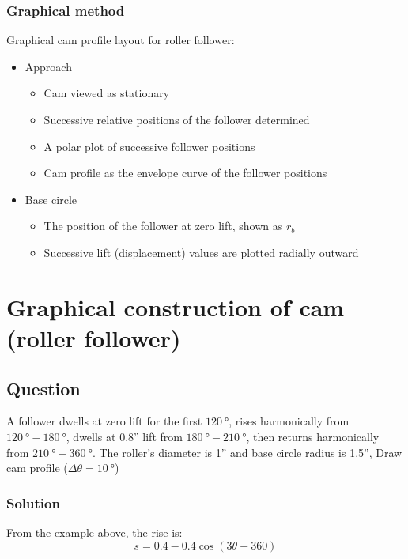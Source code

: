 \documentclass[11pt]{article}
\begin{document}
\subsubsection{Graphical method}
\label{sec:org0fa9382}
Graphical cam profile layout for roller follower:
\begin{itemize}
\item Approach
\begin{itemize}
\item Cam viewed as stationary
\item Successive relative positions of the follower determined
\item A polar plot of successive follower positions
\item Cam profile as the envelope curve of the follower positions
\end{itemize}

\item Base circle
\begin{itemize}
\item The position of the follower at zero lift, shown as \(r_b\)
\item Successive lift (displacement) values are plotted radially outward
\end{itemize}
\end{itemize}

 \newpage
\section{Graphical construction of cam (roller follower)}
\label{sec:org0833060}

\subsection{Question}
\label{sec:orge43da2b}
A follower dwells at zero lift for the first \(\qty{120}{\degree}\), rises harmonically from \(\qty{120}{\degree} - \qty{180}{\degree}\), dwells at 0.8'' lift from \(\qty{180}{\degree} - \qty{210}{\degree}\), then returns harmonically from \(\qty{210}{\degree} - \qty{360}{\degree}\). The roller's diameter is 1'' and base circle radius is 1.5'', Draw cam profile (\(\Delta \theta = \qty{10}{\degree}\))
\subsubsection{Solution}
\label{sec:orga2917ae}
From the example \hyperref[org3cc19e4]{above}, the rise is:
\[s = 0.4 - 0.4 \cos (3 \theta - 360)\]
\end{document}
